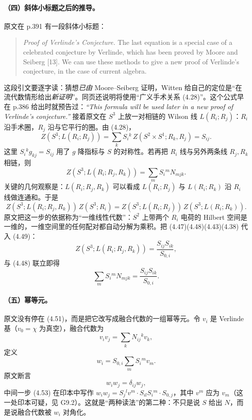 \paragraph{（四）斜体小标题之后的推导。}
原文在 p.391 有一段斜体小标题：
\begin{quote}
\emph{Proof of Verlinde's Conjecture.} The last equation is a special case of a celebrated conjecture by Verlinde, which has been proved by Moore and Seiberg [13]. We can use these methods to give a new proof of Verlinde's conjecture, in the case of current algebra.
\end{quote}
 这段引文要逐字读：猜想\emph{已由} Moore--Seiberg 证明，Witten 给自己的定位是“在流代数情形给出\emph{新证明}”。同页还说明将使用“广义手术关系 (4.28)”。这个公式早在 p.386 给出时就预告过：\emph{“This formula will be used later in a new proof of Verlinde's conjecture.”}  接着原文在 $S^3$ 上放一对相链的 Wilson 线 $L(R_i;R_j)$：$R_i$ 沿手术圈，$R_j$ 沿与它平行的圈。由 (4.28)，
\begin{equation}
Z(S^3;L(R_i;R_j))=\sum_k S_i{}^k\,Z(S^2\times S^1;R_k,R_j)=S_{ij}. \tag{4.47}
\end{equation}
这里 $S_i{}^k g_{kj}=S_{ij}$ 用了 $g$ 降指标与 $S$ 的对称性。若再把 $R_i$ 线与另外两条线 $R_j,R_k$ 相链，则
\begin{equation}
Z(S^3;L(R_i;R_j,R_k))=\sum_m S_i{}^m N_{mjk}. \tag{4.48}
\end{equation}
关键的几何观察是：$L(R_i;R_j,R_k)$ 可以看成 $L(R_i;R_j)$ 与 $L(R_i;R_k)$ 沿 $R_i$ 线做连通和。于是
\begin{equation}
Z(S^3;L(R_i;R_j,R_k))\,Z(S^3;R_i)
=Z(S^3;L(R_i;R_j))\,Z(S^3;L(R_i;R_k)). \tag{4.49}
\end{equation}
原文把这一步的依据称为“一维线性代数”：$S^2$ 上带两个 $R_i$ 电荷的 Hilbert 空间是一维的，一维空间里的任何配对都自动分解为乘积。把 (4.47)(4.48)(4.43)(4.38) 代入 (4.49)：
\begin{equation}
Z(S^3;L(R_i;R_j,R_k))=\frac{S_{ij}S_{ik}}{S_{0,i}}, \tag{4.50}
\end{equation}
与 (4.48) 联立即得
\begin{equation}
\sum_m S_i{}^m N_{mjk}=\frac{S_{ij}S_{ik}}{S_{0,i}} .
\label{eq:verlinde-key}
\tag{4.51}
\end{equation}

\paragraph{（五）幂等元。}
原文没有停在 (4.51)，而是把它改写成融合代数的一组幂等元。令 $v_i$ 是 Verlinde 基（$v_0=\chi$ 为真空），融合代数为
\begin{equation}
v_i v_j=\sum_k N_{ij}{}^{k}v_k ,
\end{equation}
定义
\begin{equation}
w_i=S_{0,i}\sum_m S_i{}^m v_m . \tag{4.52}
\end{equation}
原文断言
\begin{equation}
w_i w_j=\delta_{ij}w_j , \tag{4.54}
\end{equation}
中间一步 (4.53) 在印本中写作 $w_iw_j=S_j{}^l v^m\cdot S_{il}S_i{}^m\cdot S_{0,j}$，其中 $v^m$ 应为 $v_m$（这一处印本可疑，见 G9.2）。这就是“两种读法”的第二种：不只是说 $S$ 给出 $N$，而是说融合代数被 $w_i$ 对角化。

